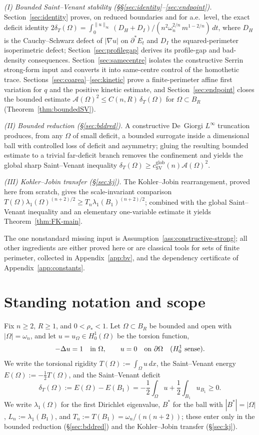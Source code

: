 \documentclass[11pt]{amsart}
\theoremstyle{definition}
\newcommand{\Om}{\Omega}
\newcommand{\Fr}{\mathcal A}
\newcommand{\dT}{\delta_T}
\newcommand{\rstar}{\rho_*}
\newcommand{\Bstar}{B^*}
\begin{document}
\emph{(I) Bounded Saint--Venant stability
(\S\S\ref{sec:identity}--\ref{sec:endpoint}).}
Section~\ref{sec:identity} proves, on reduced boundaries and for a.e.\ level, the
exact deficit identity
\(2\dT(\Om)=\int_0^{\|u\|_\infty}(D_H+D_I)/(n^2\omega_n^{2/n}\,m^{1-2/n})\,dt\),
where \(D_H\) is the Cauchy--Schwarz defect of \(|\nabla u|\) on
\(\partial^*E_t\) and \(D_I\) the squared-perimeter isoperimetric defect;
Section~\ref{sec:profilegap} derives its profile-gap and bad-density
consequences.  Section~\ref{sec:samecentre} isolates the constructive Serrin
strong-form input and converts it into same-centre control of the homothetic
trace.
Sections~\ref{sec:coarea}--\ref{sec:kinetic} prove a finite-perimeter affine
first variation for \(q\) and the positive kinetic estimate, and
Section~\ref{sec:endpoint} closes the bounded estimate
\(\Fr(\Om)^2\le C(n,R)\,\dT(\Om)\) for \(\Om\subset B_R\)
(Theorem~\ref{thm:boundedSV}).

\emph{(II) Bounded reduction (\S\ref{sec:bddred}).}
A constructive De~Giorgi \(L^\infty\) truncation produces, from any \(\Om\) of
small deficit, a bounded surrogate inside a dimensional ball with controlled
loss of deficit and asymmetry; gluing the resulting bounded estimate to a
trivial far-deficit branch removes the confinement and yields the global sharp
Saint--Venant inequality \(\dT(\Om)\ge c_{\mathrm{SV}}^{\mathrm{glob}}(n)
\Fr(\Om)^2\).

\emph{(III) Kohler--Jobin transfer (\S\ref{sec:kj}).}
The Kohler--Jobin rearrangement, proved here from scratch, gives the
scale-invariant comparison \(T(\Om)\lambda_1(\Om)^{(n+2)/2}\ge
T_n\lambda_1(B_1)^{(n+2)/2}\); combined with the global Saint--Venant inequality
and an elementary one-variable estimate it yields Theorem~\ref{thm:FK-main}.

The one nonstandard missing input is Assumption~\ref{ass:constructive-strong};
all other ingredients are either proved here or are classical tools for sets of
finite perimeter, collected in Appendix~\ref{app:bv}, and the dependency
certificate of Appendix~\ref{app:constants}.

\section{Standing notation and scope}\label{sec:notation}

Fix \(n\ge2\), \(R\ge1\), and \(0<\rstar<1\).  Let
\(\Om\subset B_R\) be bounded and open with \(|\Om|=\omega_n\), and let
\(u=u_\Om\in H^1_0(\Om)\) be the torsion function,
\[
   -\Delta u=1\quad\hbox{in }\Om,\qquad u=0\quad\hbox{on }\partial\Om
   \quad(H^1_0\hbox{ sense}).
\]
We write the torsional rigidity \(T(\Om):=\int_\Om u\,dx\), the Saint--Venant
energy \(E(\Om):=-\tfrac12 T(\Om)\), and the Saint--Venant deficit
\[
   \dT(\Om):=E(\Om)-E(B_1)
   =-\frac12\int_\Om u+\frac12\int_{B_1}u_{B_1}\ge0.
\]
We write \(\lambda_1(\Om)\) for the first Dirichlet eigenvalue, \(\Bstar\) for
the ball with \(|\Bstar|=|\Om|\), \(L_n:=\lambda_1(B_1)\), and
\(T_n:=T(B_1)=\omega_n/(n(n+2))\); these enter only in the bounded reduction
(\S\ref{sec:bddred}) and the Kohler--Jobin transfer (\S\ref{sec:kj}).
\end{document}
